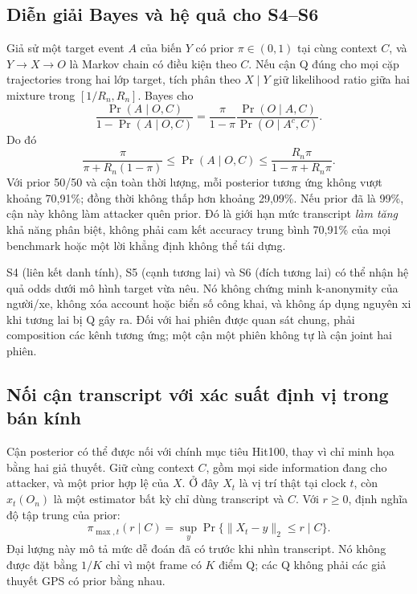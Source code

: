 \subsection{Diễn giải Bayes và hệ quả cho S4--S6}
Giả sử một target event $A$ của biến $Y$ có prior $\pi\in(0,1)$ tại cùng context $C$, và
$Y\to X\to O$ là Markov chain có điều kiện theo $C$. Nếu cận Q đúng cho mọi cặp trajectories trong
hai lớp target, tích phân theo $X\mid Y$ giữ likelihood ratio giữa hai mixture trong
$[1/R_n,R_n]$. Bayes cho
\begin{equation}
\frac{\Pr(A\mid O,C)}{1-\Pr(A\mid O,C)}
=\frac{\pi}{1-\pi}\frac{\Pr(O\mid A,C)}{\Pr(O\mid A^c,C)}.
\label{eq:odds}
\end{equation}
Do đó
\begin{equation}
\frac{\pi}{\pi+R_n(1-\pi)}\le\Pr(A\mid O,C)
\le\frac{R_n\pi}{1-\pi+R_n\pi}.
\label{eq:posterior}
\end{equation}
Với prior 50/50 và cận toàn thời lượng, mỗi posterior tương ứng không vượt khoảng 70,91\%; đồng
thời không thấp hơn khoảng 29,09\%. Nếu prior đã là 99\%, cận này không làm attacker quên prior.
Đó là giới hạn mức transcript \emph{làm tăng} khả năng phân biệt, không phải cam kết accuracy trung
bình 70,91\% của mọi benchmark hoặc một lời khẳng định không thể tái dựng.

S4 (liên kết danh tính), S5 (cạnh tương lai) và S6 (đích tương lai) có thể nhận hệ quả odds dưới
mô hình target vừa nêu. Nó không chứng minh k-anonymity của người/xe, không xóa account hoặc biển
số công khai, và không áp dụng nguyên xi khi tương lai bị Q gây ra. Đối với hai phiên được quan sát
chung, phải composition các kênh tương ứng; một cận một phiên không tự là cận joint hai phiên.

\subsection{Nối cận transcript với xác suất định vị trong bán kính}
Cận posterior có thể được nối với chính mục tiêu Hit100, thay vì chỉ minh họa bằng hai giả thuyết.
Giữ cùng context $C$, gồm mọi side information đang cho attacker, và một prior hợp lệ của $X$.
Ở đây $X_t$ là vị trí thật tại clock $t$, còn $\widehat x_t(O_n)$ là một estimator bất kỳ chỉ dùng
transcript và $C$. Với $r\ge0$, định nghĩa độ tập trung của prior:
\begin{equation}
\pi_{\max,t}(r\mid C)=\sup_y\Pr\{\|X_t-y\|_2\le r\mid C\}.
\label{eq:prior-concentration}
\end{equation}
Đại lượng này mô tả mức dễ đoán đã có trước khi nhìn transcript. Nó không được đặt bằng $1/K$
chỉ vì một frame có $K$ điểm Q; các Q không phải các giả thuyết GPS có prior bằng nhau.

